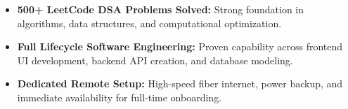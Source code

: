 \documentclass[a4paper,10pt]{article}
\begin{document}
\begin{itemize}

    \item \textbf{500+ LeetCode DSA Problems Solved:} Strong foundation in algorithms, data structures, and computational optimization.

    \item \textbf{Full Lifecycle Software Engineering:} Proven capability across frontend UI development, backend API creation, and database modeling.

    \item \textbf{Dedicated Remote Setup:} High-speed fiber internet, power backup, and immediate availability for full-time onboarding.

\end{itemize}

\end{document}
